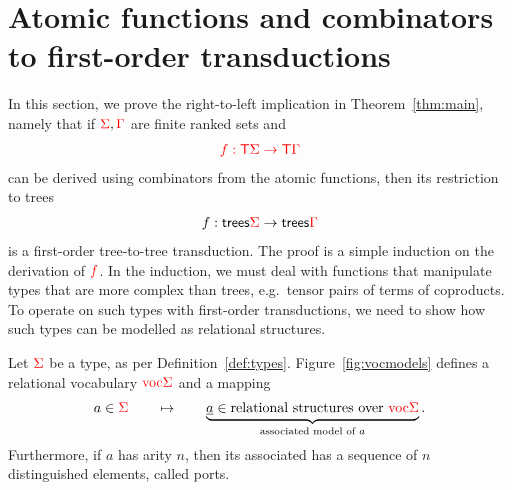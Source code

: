 \newcommand{\Root}[1]{\mathsf{root}_{#1}}
\newcommand{\Port}[1]{\mathsf{port}_{#1}}
\newcommand{\Interface}[1]{\mathsf{Interface}_{#1}}
\section{Atomic functions and combinators to first-order transductions}
\label{sec:to-transductions}
In this section, we prove the right-to-left implication in Theorem~\ref{thm:main}, namely that if ${\color{red}{\Sigma}},{\color{red}{\Gamma}}$ are finite ranked sets and 
\begin{align*}
    {\color{red}{f : {\color{red}{\mathsf T}}\Sigma \to {\color{red}{\mathsf T}}\Gamma}} 
\end{align*}
 can be derived using combinators from the atomic functions, then its restriction to trees 
\begin{align*}
    f : \mathsf {trees} {\color{red}{\Sigma}} \to \mathsf {trees} {\color{red}{\Gamma}}
\end{align*}
is a first-order tree-to-tree transduction. The proof is a simple induction on the derivation of  ${\color{red}{f}}$. In the induction, we must deal with functions that manipulate types that are more complex than trees, e.g.~tensor pairs of terms of coproducts.  To operate on such types with first-order transductions, we need to show how such types can be modelled as relational structures.




\begin{definition} \label{def:type-model} Let ${\color{red}{\Sigma}}$ be a type, as per Definition~\ref{def:types}.  Figure~\ref{fig:vocmodels} defines a relational vocabulary ${\color{red}{\mathrm{voc}}}{\color{red}{\Sigma}}$ and a mapping
    \begin{align*}
        a \in {\color{red}{\Sigma}} \qquad \mapsto \qquad \underbrace{\underline a \in \text{relational structures over ${\color{red}{\mathrm{voc}}}{\color{red}{\Sigma}}$}}_{\text{associated model of $a$}}.
    \end{align*}
    Furthermore, if $a$ has arity $n$, then its associated has a sequence of  $n$ distinguished elements, called ports.   
\end{definition}

